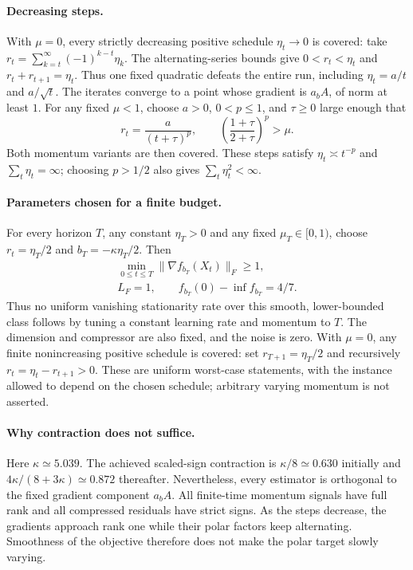 \paragraph{Decreasing steps.}
With $\mu=0$, every strictly decreasing positive schedule
$\eta_t\to0$ is covered: take
$r_t=\sum_{k=t}^{\infty}(-1)^{k-t}\eta_k$.
The alternating-series bounds give $0<r_t<\eta_t$ and
$r_t+r_{t+1}=\eta_t$. Thus one fixed quadratic defeats the entire run,
including $\eta_t=a/t$ and $a/\sqrt t$. The iterates converge to a point
whose gradient is $a_bA$, of norm at least $1$.
For any fixed $\mu<1$, choose $a>0$, $0<p\le1$, and $\tau\ge0$
large enough that
\[
 r_t=\frac{a}{(t+\tau)^p},\qquad
 \left(\frac{1+\tau}{2+\tau}\right)^p>\mu.
\]
Both momentum variants are then covered. These steps satisfy
$\eta_t\asymp t^{-p}$ and
$\sum_t\eta_t=\infty$; choosing $p>1/2$ also gives
$\sum_t\eta_t^2<\infty$.

\paragraph{Parameters chosen for a finite budget.}
For every horizon $T$, any constant $\eta_T>0$ and any fixed
$\mu_T\in[0,1)$, choose $r_t=\eta_T/2$ and
$b_T=-\kappa\eta_T/2$. Then
\begin{gather*}
 \min_{0\le t\le T}\|\nabla f_{b_T}(X_t)\|_F\ge1,\\
 L_F=1,\qquad f_{b_T}(0)-\inf f_{b_T}=4/7.
\end{gather*}
Thus no uniform vanishing stationarity rate over this smooth,
lower-bounded class follows by tuning a constant learning rate and momentum
to $T$. The dimension and compressor are also fixed, and the noise is zero.
With $\mu=0$, any finite nonincreasing positive schedule is covered:
set $r_{T+1}=\eta_T/2$ and recursively $r_t=\eta_t-r_{t+1}>0$.
These are uniform worst-case statements, with the instance allowed to
depend on the chosen schedule; arbitrary varying momentum is not asserted.

\paragraph{Why contraction does not suffice.}
Here $\kappa\simeq5.039$. The achieved scaled-sign contraction is
$\kappa/8\simeq0.630$ initially and
$4\kappa/(8+3\kappa)\simeq0.872$ thereafter.
Nevertheless, every estimator is orthogonal to the fixed gradient
component $a_bA$. All finite-time momentum signals have full rank and
all compressed residuals have strict signs.
As the steps decrease, the gradients approach rank one
while their polar factors keep alternating. Smoothness of the objective
therefore does not make the polar target slowly varying.

